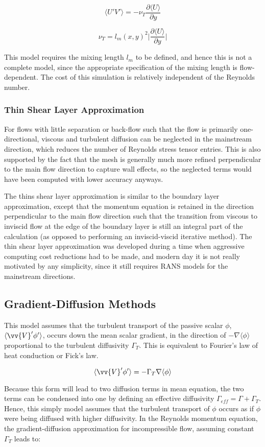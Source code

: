 \documentclass[10pt]{article}
\newcommand{\beq}{\begin{equation}}
\newcommand{\eeq}{\end{equation}}
\newcommand{\la}{\langle}
\newcommand{\ra}{\rangle}
\begin{document}
\begin{flushleft}
\beq
\la U'V'\ra=-\nu_T\frac{\partial\la U\ra}{\partial y}
\eeq

\beq
\nu_T=l_m(x,y)^2\biggr\rvert\frac{\partial\la U\ra}{\partial y}\biggr\rvert
\eeq

This model requires the mixing length \(l_m\) to be defined, and hence this is not a complete model, since the appropriate specification of the mixing length is flow-dependent. The cost of this simulation is relatively independent of the Reynolds number. 

\subsubsection{Thin Shear Layer Approximation}
For flows with little separation or back-flow such that the flow is primarily one-directional, viscous and turbulent diffusion can be neglected in the mainstream direction, which reduces the number of Reynolds stress tensor entries. This is also supported by the fact that the mesh is generally much more refined perpendicular to the main flow direction to capture wall effects, so the neglected terms would have been computed with lower accuracy anyways. %

The thins shear layer approximation is similar to the boundary layer approximation, except that the momentum equation is retained in the direction perpendicular to the main flow direction such that the transition from viscous to inviscid flow at the edge of the boundary layer is still an integral part of the calculation (as opposed to performing an inviscid-viscid iterative method). The thin shear layer approximation was developed during a time when aggressive computing cost reductions had to be made, and modern day it is not really motivated by any simplicity, since it still requires RANS models for the mainstream directions.

\subsection{Gradient-Diffusion Methods}
This model assumes that the turbulent transport of the passive scalar \(\phi\), \(\la \vv{V}'\phi'\ra\), occurs down the mean scalar gradient, in the direction of \(-\nabla\la\phi\ra\) proportional to the turbulent diffusivity \(\Gamma_T\). This is equivalent to Fourier's law of heat conduction or Fick's law.

\beq
\la\vv{V}'\phi'\ra=-\Gamma_T\nabla\la\phi\ra
\eeq

Because this form will lead to two diffusion terms in mean equation, the two terms can be condensed into one by defining an effective diffusivity \(\Gamma_{eff}=\Gamma+\Gamma_T\). Hence, this simply model assumes that the turbulent transport of \(\phi\) occurs as if \(\phi\) were being diffused with higher diffusivity. In the Reynolds momentum equation, the gradient-diffusion approximation for incompressible flow, assuming constant \(\Gamma_T\) leads to:


\end{flushleft}
\end{document}
